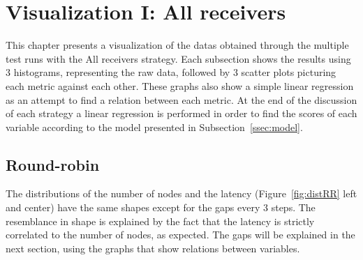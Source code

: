 \begin{table}[H]
\end{table}


\section{Visualization I: All receivers}
This chapter presents a visualization of the datas obtained through the multiple
test runs with the All receivers strategy.  Each subsection shows the results
using 3 histograms, representing the raw data, followed by 3 scatter plots
picturing each metric against each other. These graphs also show a simple linear
regression as an attempt to find a relation between each metric. At the end of
the discussion of each strategy a linear regression is performed in order to
find the scores of each variable according to the model presented in
Subsection~\ref{ssec:model}.



\subsection{Round-robin}

The distributions of the number of nodes and the latency
(Figure~\ref{fig:distRR} left and center) have the same
shapes except for the gaps every 3 steps. The resemblance in shape is explained
by the fact that the latency is strictly correlated to the number of nodes, as
expected.
The gaps will be explained in the next section, using the graphs that show
relations between variables. 

